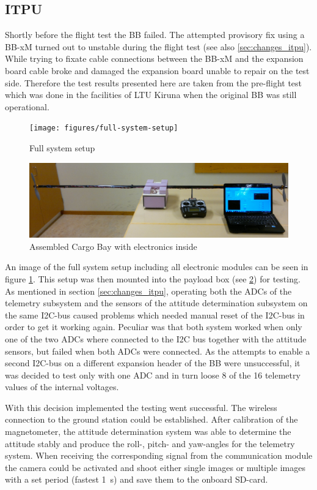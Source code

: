 \subsection{ITPU}
%
Shortly before the flight test the BB failed. The attempted provisory fix using a BB-xM turned out to unstable during the flight test (see also \ref{sec:changes_itpu}). While trying to fixate cable connections between the BB-xM and the expansion board cable broke and damaged the expansion board unable to repair on the test side. Therefore the test results presented here are taken from the pre-flight test which was done in the facilities of LTU Kiruna when the original BB was still operational.

\begin{figure}
\centering
\texttt{[image: figures/full-system-setup]}
\caption{Full system setup}
\label{fig:full_system}
\end{figure}

\begin{figure}
\centering
\includegraphics[width=\textwidth]{figures/fig_CargoBay}
\caption{Assembled Cargo Bay with electronics inside}
\label{fig:cargo_bay}
\end{figure}

An image of the full system setup including all electronic modules can be seen in figure \ref{fig:full_system}. This setup was then mounted into the payload box (see \ref{fig:cargo_bay}) for testing. As mentioned in section \ref{sec:changes_itpu}, operating both the ADCs of the telemetry subsystem and the sensors of the attitude determination subsystem on the same I2C-bus caused problems which needed manual reset of the I2C-bus in order to get it working again. Peculiar was that both system worked when only one of the two ADCs where connected to the I2C bus together with the attitude sensors, but failed when both ADCs were connected. As the attempts to enable a second I2C-bus on a different expansion header of the BB were unsuccessful, it was decided to test only with one ADC and in turn loose 8 of the 16 telemetry values of the internal voltages. 

With this decision implemented the testing went successful. The wireless connection to the ground station could be established. After calibration of the magnetometer, the attitude determination system was able to determine the attitude stably and produce the roll-, pitch- and yaw-angles for the telemetry system. When receiving the corresponding signal from the communication module the camera could be activated and shoot either single images or multiple images with a set period (fastest 1~s) and save them to the onboard SD-card.  

